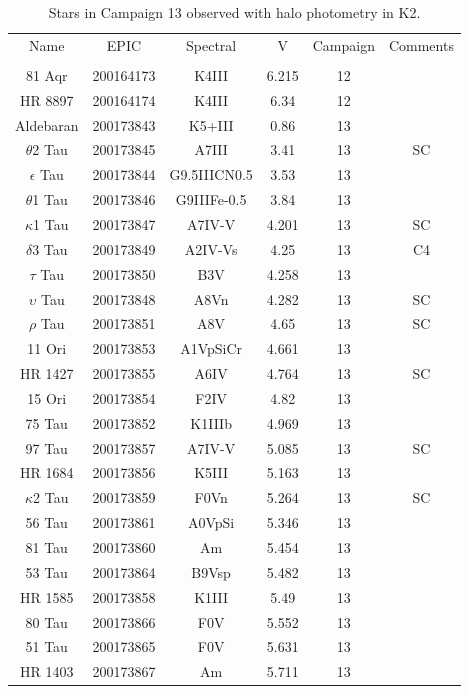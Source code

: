 \begin{table*}
\caption{Stars in Campaign 13 observed with halo photometry in K2.\label{table_3}}
\begin{tabular}{cccccc}
\hline \hline
Name & EPIC & Spectral & V & Campaign & Comments \\
 &  &  &  &  &  \\
\hline
81 Aqr & 200164173 & K4III & 6.215 & 12 &  \\
HR 8897 & 200164174 & K4III & 6.34 & 12 &  \\
Aldebaran & 200173843 & K5+III & 0.86 & 13 & \tablenotemark{c} \\
$\theta$2 Tau & 200173845 & A7III & 3.41 & 13 & SC \\
$\epsilon$ Tau & 200173844 & G9.5IIICN0.5 & 3.53 & 13 & \tablenotemark{d} \\
$\theta$1 Tau & 200173846 & G9IIIFe-0.5 & 3.84 & 13 &  \\
$\kappa$1 Tau & 200173847 & A7IV-V & 4.201 & 13 & SC \\
$\delta$3 Tau & 200173849 & A2IV-Vs & 4.25 & 13 & C4 \\
$\tau$ Tau & 200173850 & B3V & 4.258 & 13 &  \\
$\upsilon$ Tau & 200173848 & A8Vn & 4.282 & 13 & SC \\
$\rho$ Tau & 200173851 & A8V & 4.65 & 13 & SC \\
11 Ori & 200173853 & A1VpSiCr & 4.661 & 13 &  \\
HR 1427 & 200173855 & A6IV & 4.764 & 13 & SC \\
15 Ori & 200173854 & F2IV & 4.82 & 13 &  \\
75 Tau & 200173852 & K1IIIb & 4.969 & 13 &  \\
97 Tau & 200173857 & A7IV-V & 5.085 & 13 & SC \\
HR 1684 & 200173856 & K5III & 5.163 & 13 &  \\
$\kappa$2 Tau & 200173859 & F0Vn & 5.264 & 13 & SC \\
56 Tau & 200173861 & A0VpSi & 5.346 & 13 &  \\
81 Tau & 200173860 & Am & 5.454 & 13 &  \\
53 Tau & 200173864 & B9Vsp & 5.482 & 13 &  \\
HR 1585 & 200173858 & K1III & 5.49 & 13 &  \\
80 Tau & 200173866 & F0V & 5.552 & 13 &  \\
51 Tau & 200173865 & F0V & 5.631 & 13 &  \\
HR 1403 & 200173867 & Am & 5.711 & 13 &  \\

\end{tabular}
\end{table*}
